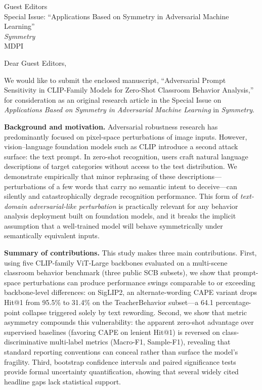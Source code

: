 \documentclass[11pt]{letter}
\date{June 29, 2026}
\begin{document}
\begin{letter}{Guest Editors \\ Special Issue: ``Applications Based on Symmetry in Adversarial Machine Learning'' \\ \textit{Symmetry} \\ MDPI}

\opening{Dear Guest Editors,}

We would like to submit the enclosed manuscript, ``Adversarial Prompt Sensitivity in CLIP-Family Models for Zero-Shot Classroom Behavior Analysis,'' for consideration as an original research article in the Special Issue on \textit{Applications Based on Symmetry in Adversarial Machine Learning} in \textit{Symmetry}.

\textbf{Background and motivation.}
Adversarial robustness research has predominantly focused on pixel-space perturbations of image inputs. However, vision--language foundation models such as CLIP introduce a second attack surface: the text prompt. In zero-shot recognition, users craft natural language descriptions of target categories without access to the test distribution. We demonstrate empirically that minor rephrasing of these descriptions---perturbations of a few words that carry no semantic intent to deceive---can silently and catastrophically degrade recognition performance. This form of \emph{text-domain adversarial-like perturbation} is practically relevant for any behavior analysis deployment built on foundation models, and it breaks the implicit assumption that a well-trained model will behave symmetrically under semantically equivalent inputs.

\textbf{Summary of contributions.}
This study makes three main contributions. First, using five CLIP-family ViT-Large backbones evaluated on a multi-scene classroom behavior benchmark (three public SCB subsets), we show that prompt-space perturbations can produce performance swings comparable to or exceeding backbone-level differences: on SigLIP2, an alternate-wording CAPE variant drops Hit@1 from 95.5\% to 31.4\% on the TeacherBehavior subset---a 64.1 percentage-point collapse triggered solely by text rewording. Second, we show that metric asymmetry compounds this vulnerability: the apparent zero-shot advantage over supervised baselines (favoring CAPE on lenient Hit@1) is reversed on class-discriminative multi-label metrics (Macro-F1, Sample-F1), revealing that standard reporting conventions can conceal rather than surface the model's fragility. Third, bootstrap confidence intervals and paired significance tests provide formal uncertainty quantification, showing that several widely cited headline gaps lack statistical support.


\end{letter}
\end{document}
